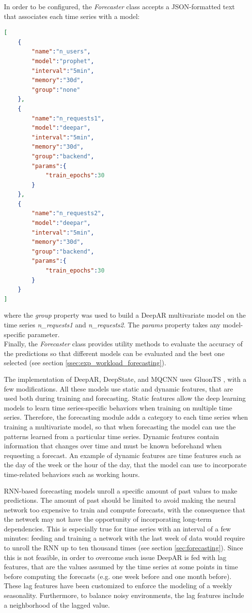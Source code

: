 \documentclass[a4paper, 12pt]{article} %
\begin{document}
	In order to be configured, the \textit{Forecaster} class accepts a JSON-formatted text that associates each time series with a model:\\
\begin{lstlisting}[language=json,firstnumber=1, frame=single]
[
	{
		"name":"n_users",
		"model":"prophet",
		"interval":"5min",
		"memory":"30d",
		"group":"none"
	},
	{
		"name":"n_requests1",
		"model":"deepar",
		"interval":"5min",
		"memory":"30d",
		"group":"backend",
		"params":{
			"train_epochs":30
		}
	},
	{
		"name":"n_requests2",
		"model":"deepar",
		"interval":"5min",
		"memory":"30d",
		"group":"backend",
		"params":{
			"train_epochs":30
		}
	}
]
\end{lstlisting}
	where the \textit{group} property was used to build a DeepAR multivariate model on the time series \textit{n\_requests1} and \textit{n\_requests2}. The \textit{params} property takes any model-specific parameter.\\
	Finally, the \textit{Forecaster} class provides utility methods to evaluate the accuracy of the predictions so that different models can be evaluated and the best one selected (see section \ref{ssec:exp_workload_forecasting}).
	
	The implementation of DeepAR, DeepState, and MQCNN uses GluonTS \cite{GluonTS}, with a few modifications. All these models use static and dynamic features, that are used both during training and forecasting. Static features allow the deep learning models to learn time series-specific behaviors when training on multiple time series. Therefore, the forecasting module adds a category to each time series when training a multivariate model, so that when forecasting the model can use the patterns learned from a particular time series. Dynamic features contain information that changes over time and must be known beforehand when requesting a forecast. An example of dynamic features are time features such as the day of the week or the hour of the day, that the model can use to incorporate time-related behaviors such as working hours.
	
	RNN-based forecasting models unroll a specific amount of past values to make predictions. The amount of past should be limited to avoid making the neural network too expensive to train and compute forecasts, with the consequence that the network may not have the opportunity of incorporating long-term dependencies. This is especially true for time series with an interval of a few minutes: feeding and training a network with the last week of data would require to unroll the RNN up to ten thousand times (see section \ref{sec:forecasting}). Since this is not feasible, in order to overcome such issue DeepAR is fed with lag features, that are the values assumed by the time series at some points in time before computing the forecasts (e.g. one week before and one month before). These lag features have been customized to enforce the modeling of a weekly seasonality. Furthermore, to balance noisy environments, the lag features include a neighborhood of the lagged value.
	
\end{document}
